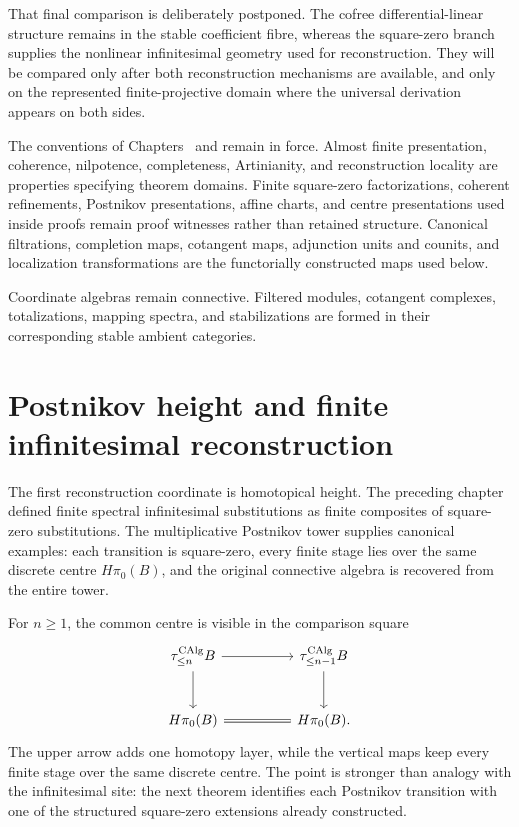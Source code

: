 That final comparison is deliberately postponed. The cofree differential-linear
structure remains in the stable coefficient fibre, whereas the square-zero branch
supplies the nonlinear infinitesimal geometry used for reconstruction. They will be
compared only after both reconstruction mechanisms are available, and only on the
represented finite-projective domain where the universal derivation appears on both
sides.

The conventions of Chapters~ and
 remain in force. Almost finite
presentation, coherence, nilpotence, completeness, Artinianity, and reconstruction
locality are properties specifying theorem domains. Finite square-zero
factorizations, coherent refinements, Postnikov presentations, affine charts, and
centre presentations used inside proofs remain proof witnesses rather than retained
structure. Canonical filtrations, completion maps, cotangent maps, adjunction units
and counits, and localization transformations are the functorially constructed maps
used below.

Coordinate algebras remain connective. Filtered modules, cotangent complexes,
totalizations, mapping spectra, and stabilizations are formed in their corresponding
stable ambient categories.

\section{Postnikov height and finite infinitesimal reconstruction}
\label{sec:postnikov-reconstruction}

The first reconstruction coordinate is homotopical height. The preceding chapter defined
finite spectral infinitesimal substitutions as finite composites of square-zero
substitutions. The multiplicative Postnikov tower supplies canonical examples: each
transition is square-zero, every finite stage lies over the same discrete centre
\(H\pi_0(B)\), and the original connective algebra is recovered from the entire tower.

For \(n\geq1\), the common centre is visible in the comparison square
\[
\begin{tikzcd}[column sep=huge,row sep=large]
    \tau_{\leq n}^{\CAlg}B \arrow[r] \arrow[d]
        & \tau_{\leq n-1}^{\CAlg}B \arrow[d]
    \\
    H\pi_0(B) \arrow[r,equal]
        & H\pi_0(B).
\end{tikzcd}
\]
The upper arrow adds one homotopy layer, while the vertical maps keep every finite stage
over the same discrete centre. The point is stronger than analogy with the infinitesimal
site: the next theorem identifies each Postnikov transition with one of the structured
square-zero extensions already constructed.


